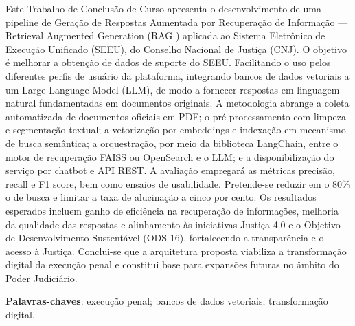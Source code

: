 %
%

\begin{RESUMO}
\thispagestyle{empty}
\OnehalfSpacing

\noindent Este Trabalho de Conclusão de Curso apresenta o desenvolvimento de uma pipeline de Geração de Respostas Aumentada por Recuperação de Informação — Retrieval Augmented Generation (RAG ) aplicada ao Sistema Eletrônico de Execução Unificado (SEEU), do Conselho Nacional de Justiça (CNJ). O objetivo é melhorar a obtenção de dados de suporte do SEEU. Facilitando o uso pelos diferentes perfis de usuário da plataforma, integrando bancos de dados vetoriais a um Large Language Model (LLM), de modo a fornecer respostas em linguagem natural fundamentadas em documentos originais. A metodologia abrange a coleta automatizada de documentos oficiais em PDF; o pré-processamento com limpeza e segmentação textual; a vetorização por embeddings e indexação em mecanismo de busca semântica; a orquestração, por meio da biblioteca LangChain, entre o motor de recuperação FAISS ou OpenSearch e o LLM; e a disponibilização do serviço por chatbot e API REST. A avaliação empregará as métricas precisão, recall  e F1 score, bem como ensaios de usabilidade. Pretende-se reduzir em o 80\% o de busca e limitar a taxa de alucinação a cinco por cento. Os resultados esperados incluem ganho de eficiência na recuperação de informações, melhoria da qualidade das respostas e alinhamento às iniciativas Justiça 4.0 e o Objetivo de Desenvolvimento Sustentável (ODS 16), fortalecendo a transparência e o acesso à Justiça. Conclui-se que a arquitetura proposta viabiliza a transformação digital da execução penal e constitui base para expansões futuras no âmbito do Poder Judiciário.

\SingleSpacing
\noindent \textbf{Palavras-chaves}: execução penal; bancos de dados vetoriais; transformação digital.

\end{RESUMO}

